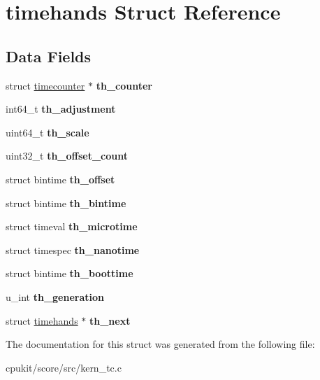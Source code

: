 \hypertarget{structtimehands}{}\section{timehands Struct Reference}
\label{structtimehands}
\subsection*{Data Fields}
\begin{DoxyCompactItemize}
\item 
\mbox{\label{structtimehands_a6e873b4aa6fa46eaad2c2b7199ed7555}} 
struct \mbox{\hyperlink{structtimecounter}{timecounter}} $\ast$ {\bfseries th\+\_\+counter}
\item 
\mbox{\label{structtimehands_a8b85c0a8aa3f90feba9d4bc9cbe741b6}} 
int64\+\_\+t {\bfseries th\+\_\+adjustment}
\item 
\mbox{\label{structtimehands_a4b079bb7849db9a6ea3abf069ad8905a}} 
uint64\+\_\+t {\bfseries th\+\_\+scale}
\item 
\mbox{\label{structtimehands_a0ffd23635530edd42e3d8f8844523d35}} 
uint32\+\_\+t {\bfseries th\+\_\+offset\+\_\+count}
\item 
\mbox{\label{structtimehands_a8343df3d16d957ac6054336b6304d494}} 
struct bintime {\bfseries th\+\_\+offset}
\item 
\mbox{\label{structtimehands_a3bc3499b05913be14bf2968e7fe6ce21}} 
struct bintime {\bfseries th\+\_\+bintime}
\item 
\mbox{\label{structtimehands_a903e7fb963b8feed7a67c05a15cf9bfc}} 
struct timeval {\bfseries th\+\_\+microtime}
\item 
\mbox{\label{structtimehands_a194617542b2cba6072b118b6168cff6e}} 
struct timespec {\bfseries th\+\_\+nanotime}
\item 
\mbox{\label{structtimehands_af3aa7f25829422014014889ad4ad9d5d}} 
struct bintime {\bfseries th\+\_\+boottime}
\item 
\mbox{\label{structtimehands_a759f4ac823300fac1fb4b8f8108459d8}} 
u\+\_\+int {\bfseries th\+\_\+generation}
\item 
\mbox{\label{structtimehands_aacc6032d0d797b8a67a36df3ca117021}} 
struct \mbox{\hyperlink{structtimehands}{timehands}} $\ast$ {\bfseries th\+\_\+next}
\end{DoxyCompactItemize}


The documentation for this struct was generated from the following file\+:\begin{DoxyCompactItemize}
\item 
cpukit/score/src/kern\+\_\+tc.\+c\end{DoxyCompactItemize}
